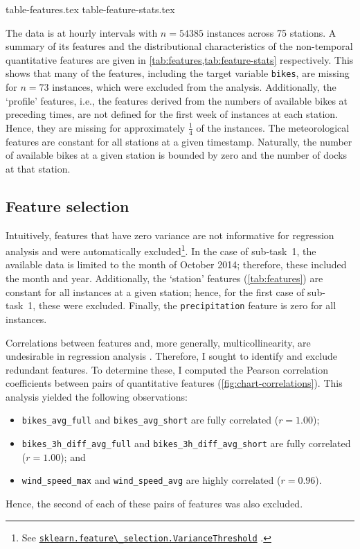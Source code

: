 \documentclass[11pt]{extarticle}
\newcommand{\sklearn}[1]{
  \href{https://scikit-learn.org/stable/modules/generated/sklearn.#1.html}{\lstinline|sklearn.#1|}
}
\newcommand{\windspeedmax}{wind\_speed\_max}
\newcommand{\windspeedavg}{wind\_speed\_avg}
\newcommand{\bikesavgfull}{bikes\_avg\_full}
\newcommand{\bikesavgshort}{bikes\_avg\_short}
\newcommand{\bikeshdiffavgfull}{bikes\_3h\_diff\_avg\_full}
\newcommand{\bikeshdiffavgshort}{bikes\_3h\_diff\_avg\_short}
\begin{document}
{table-features.tex}
{table-feature-stats.tex}

The data is at hourly intervals with $n = 54385$ instances across 75 stations.
A summary of its features and the distributional characteristics of the non-temporal
quantitative features are given in \cref{tab:features,tab:feature-stats} respectively.
This shows that many of the features, including the target variable
\texttt{bikes}, are missing for $n = 73$ instances, which were excluded from the analysis.
Additionally, the `profile' features, i.e., the features derived from the numbers of
available bikes at preceding times, are not defined for the first week of instances at
each station.
Hence, they are missing for approximately $\frac{1}{4}$ of the instances.
The meteorological features are constant for all stations at a given timestamp.
Naturally, the number of available bikes at a given station is bounded by zero and the
number of docks at that station.

\subsection{Feature selection}
\label{sec:feature-selection}

Intuitively, features that have zero variance are not informative for regression
analysis and were automatically
excluded\footnote{See \sklearn{feature\_selection.VarianceThreshold}.}.
In the case of sub-task~1, the available data is limited to the month of October 2014; therefore, these included the month and year.
Additionally, the `station' features (\cref{tab:features}) are constant for all
instances at a given station; hence, for the first case of sub-task~1, these were
excluded.
Finally, the \texttt{precipitation} feature is zero for all instances.

Correlations between features and, more generally, multicollinearity, are undesirable in regression analysis \parencite{Alin2010}.
Therefore, I sought to identify and exclude redundant features.
To determine these, I computed the Pearson correlation coefficients between pairs of quantitative features (\cref{fig:chart-correlations}).
This analysis yielded the following observations:
\begin{itemize}
  \item \texttt{\bikesavgfull} and \texttt{\bikesavgshort} are fully correlated ($r = 1.00$);
  \item \texttt{\bikeshdiffavgfull} and \texttt{\bikeshdiffavgshort} are fully correlated ($r  = 1.00$); and
  \item \texttt{\windspeedmax} and \texttt{\windspeedavg} are highly correlated ($r = 0.96$).
\end{itemize}
Hence, the second of each of these pairs of features was also excluded.
\end{document}

